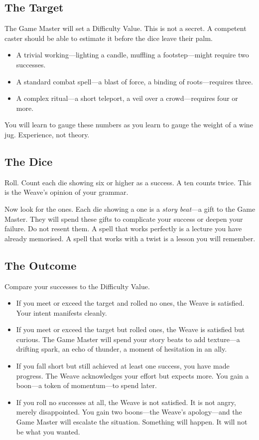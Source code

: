 \subsection{The Target}

The Game Master will set a Difficulty Value. This is not a secret. A competent caster should be able to estimate it before the dice leave their palm.

\begin{itemize}
    \item A trivial working---lighting a candle, muffling a footstep---might require two successes.
    \item A standard combat spell---a blast of force, a binding of roots---requires three.
    \item A complex ritual---a short teleport, a veil over a crowd---requires four or more.
\end{itemize}

You will learn to gauge these numbers as you learn to gauge the weight of a wine jug. Experience, not theory.

\subsection{The Dice}

Roll. Count each die showing six or higher as a success. A ten counts twice. This is the Weave's opinion of your grammar.

Now look for the ones. Each die showing a one is a \emph{story beat}---a gift to the Game Master. They will spend these gifts to complicate your success or deepen your failure. Do not resent them. A spell that works perfectly is a lecture you have already memorised. A spell that works with a twist is a lesson you will remember.

\subsection{The Outcome}

Compare your successes to the Difficulty Value.

\begin{itemize}
    \item If you meet or exceed the target and rolled no ones, the Weave is satisfied. Your intent manifests cleanly.
    \item If you meet or exceed the target but rolled ones, the Weave is satisfied but curious. The Game Master will spend your story beats to add texture---a drifting spark, an echo of thunder, a moment of hesitation in an ally.
    \item If you fall short but still achieved at least one success, you have made progress. The Weave acknowledges your effort but expects more. You gain a boon---a token of momentum---to spend later.
    \item If you roll no successes at all, the Weave is not satisfied. It is not angry, merely disappointed. You gain two boons---the Weave's apology---and the Game Master will escalate the situation. Something will happen. It will not be what you wanted.
\end{itemize}

